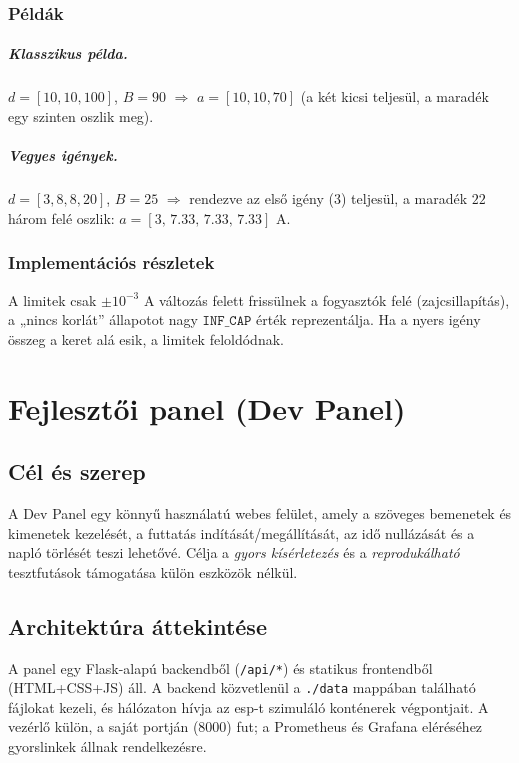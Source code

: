 \subsection{Példák}
\paragraph{Klasszikus példa.}
\(d=[10,10,100]\), \(B=90\) \(\Rightarrow\) \(a=[10,10,70]\) (a két kicsi teljesül, a maradék egy szinten oszlik meg).
\paragraph{Vegyes igények.}
\(d=[3,8,8,20]\), \(B=25\) \(\Rightarrow\) rendezve az első igény (3) teljesül, a maradék \(22\) 
három felé oszlik: \(a=[3,\,7.33,\,7.33,\,7.33]\) A.

\subsection{Implementációs részletek}
A limitek csak \(\pm 10^{-3}\) A változás felett frissülnek a fogyasztók felé (zajcsillapítás), 
a „nincs korlát” állapotot nagy \(\texttt{INF\_CAP}\) érték reprezentálja. Ha a nyers igény összeg a keret alá esik, 
a limitek feloldódnak.


\chapter{Fejlesztői panel (Dev Panel)}

\section{Cél és szerep}
A Dev Panel egy könnyű használatú webes felület, amely a szöveges bemenetek és kimenetek kezelését, 
a futtatás indítását/megállítását, az idő nullázását és a napló törlését teszi lehetővé. Célja 
a \emph{gyors kísérletezés} és a \emph{reprodukálható} tesztfutások támogatása külön eszközök nélkül.

\section{Architektúra áttekintése}
A panel egy Flask-alapú backendből (\texttt{/api/*}) és statikus frontendből (HTML+CSS+JS) áll. 
A backend közvetlenül a \texttt{./data} mappában található fájlokat kezeli, 
és hálózaton hívja az esp-t szimuláló konténerek végpontjait. A vezérlő külön, 
a saját portján (\(8000\)) fut; a Prometheus és Grafana eléréséhez gyorslinkek állnak rendelkezésre.

